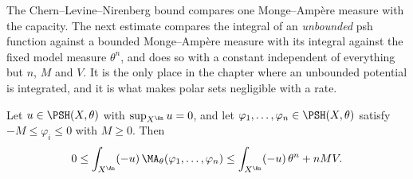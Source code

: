 The Chern--Levine--Nirenberg bound compares one Monge--Amp\`ere measure with
the capacity.  The next estimate compares the integral of an
\emph{unbounded} psh function against a bounded Monge--Amp\`ere measure with
its integral against the fixed model measure $\theta^n$, and does so with a
constant independent of everything but $n$, $M$ and $V$.  It is the
only place in the chapter where an unbounded potential is integrated, and it
is what makes polar sets negligible with a rate.

\begin{lemma}
\label{lem:ch25-uniform-integrability}
Let $u\in\PSH(X,\theta)$ with $\sup_{X^{\An}}u=0$, and let
$\varphi_1,\ldots,\varphi_n\in\PSH(X,\theta)$ satisfy
$-M\leq\varphi_i\leq0$ with $M\geq0$.  Then
\begin{equation}
\label{eq:ch25-uniform-integrability}
 0\leq\int_{X^{\An}}(-u)\,\MA_\theta(\varphi_1,\ldots,\varphi_n)
 \leq\int_{X^{\An}}(-u)\,\theta^n+nMV .
\end{equation}
\end{lemma}


